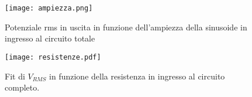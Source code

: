 \begin{figure}[h]
	\centering
	\texttt{[image: ampiezza.png]}
	\caption{Potenziale rms in uscita in funzione dell'ampiezza della sinusoide in ingresso al circuito totale}
	\label{f:risposta_ampiezza}
\end{figure}

\begin{figure}[h]
	\centering
	\texttt{[image: resistenze.pdf]}
	\caption{Fit di $V_{RMS}$ in funzione della resistenza in ingresso al circuito completo.}
	\label{f:resistenze}
\end{figure}